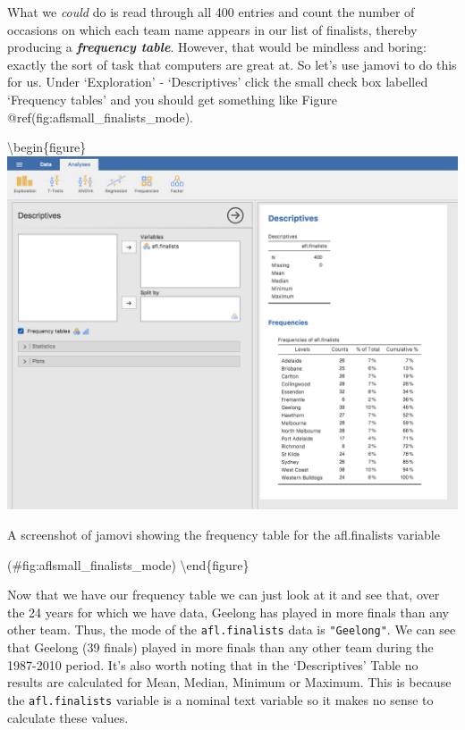 \documentclass[
]{book}
\begin{document}
What we \emph{could} do is read through all 400 entries and count the number of occasions on which each team name appears in our list of finalists, thereby producing a \textbf{\emph{frequency table}}. However, that would be mindless and boring: exactly the sort of task that computers are great at. So let's use jamovi to do this for us. Under `Exploration' - `Descriptives' click the small check box labelled `Frequency tables' and you should get something like Figure @ref(fig:aflsmall\_finalists\_mode).

\textbackslash begin\{figure\}
\includegraphics[width=15.22in]{img/descriptives/aflsmall_finalists_mode}

\caption{A screenshot of jamovi showing the frequency table for the afl.finalists variable}

(\#fig:aflsmall\_finalists\_mode)
\textbackslash end\{figure\}

Now that we have our frequency table we can just look at it and see that, over the 24 years for which we have data, Geelong has played in more finals than any other team. Thus, the mode of the \texttt{afl.finalists} data is \texttt{"Geelong"}. We can see that Geelong (39 finals) played in more finals than any other team during the 1987-2010 period. It's also worth noting that in the `Descriptives' Table no results are calculated for Mean, Median, Minimum or Maximum. This is because the \texttt{afl.finalists} variable is a nominal text variable so it makes no sense to calculate these values.
\end{document}
